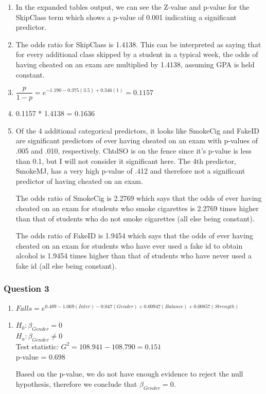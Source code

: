 \documentclass{article}
\begin{document}
\begin{enumerate}
\def\labelenumi{\alph{enumi})}
\setcounter{enumi}{5}
\item
  In the expanded tables output, we can see the Z-value and p-value for
  the SkipClass term which shows a p-value of 0.001 indicating a
  significant predictor.
\item
  The odds ratio for SkipClass is 1.4138. This can be interpreted as
  saying that for every additional class skipped by a student in a
  typical week, the odds of having cheated on an exam are multiplied by
  1.4138, assuming GPA is held constant.
\item
  \(\dfrac{p}{1-p} = e^{-1.190 - 0.375(3.5) + 0.346(1)} = 0.1157\)
\item
  0.1157 * 1.4138 = 0.1636
\item
  Of the 4 additional categorical predictors, it looks like SmokeCig and
  FakeID are significant predictors of ever having cheated on an exam
  with p-values of .005 and .010, respectively. ChtdSO is on the fence
  since it's p-value is less than 0.1, but I will not consider it
  significant here. The 4th predictor, SmokeMJ, has a very high p-value
  of .412 and therefore not a significant predictor of having cheated on
  an exam.

The odds ratio of SmokeCig is 2.2769 which says that the odds of ever
having cheated on an exam for students who smoke cigarettes is 2.2769
times higher than that of students who do not smoke cigarettes (all else
being constant).

The odds ratio of FakeID is 1.9454 which says that the odds of ever
having cheated on an exam for students who have ever used a fake id to
obtain alcohol is 1.9454 times higher than that of students who have
never used a fake id (all else being constant).
\end{enumerate}

    \subsubsection{Question 3}\label{question-3}

\begin{enumerate}
\def\labelenumi{\alph{enumi})}
\item
  \(Falls = e^{0.489 - 1.069(Inter) - 0.047(Gender) + 0.00947(Balance) + 0.00857(Strength)}\)
\end{enumerate}

\begin{enumerate}
 \def\labelenumi{\alph{enumi})}
 \setcounter{enumi}{1}
 \item 
\(H_0: \beta_{Gender} = 0\)  \\
\(H_a: \beta_{Gender} \ne 0\) \\
Test statistic: \(G^2 = 108.941 - 108.790 = 0.151\) \\
p-value = 0.698

Based on the p-value, we do not have enough evidence to reject the null
hypothesis, therefore we conclude that \(\beta_{Gender} = 0\).
\end{enumerate}
\end{document}
